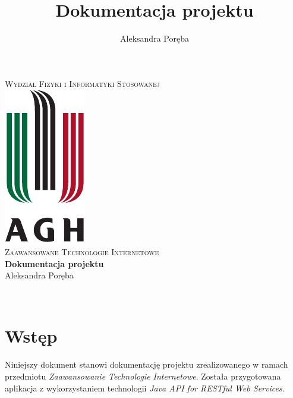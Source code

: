 \documentclass[12pt]{article}
\title{Dokumentacja projektu}
\author{Aleksandra Poręba}
\makeatletter
\let\thetitle\@title
\let\theauthor\@author
\makeatother
\begin{document}
\begin{center}
\textsc{\normalsize Wydział Fizyki i Informatyki Stosowanej}\\[2.0cm] 
\includegraphics[scale = 1]{logo.pdf}\\[1cm] 
\textsc{\Large Zaawansowane Technologie Internetowe}\\[0.4cm] 


{ \huge \bfseries \LARGE{Dokumentacja projektu} }\\[0.2cm] 

\flushright \Large Aleksandra Poręba

\vfill 

\center {\today}\\[2cm] 


\pagebreak 

\end{center}

\setcounter{tocdepth}{2}
\tableofcontents
\pagebreak


\pagestyle{fancy}
\fancyhf{}

\rhead{\theauthor}
\lhead{\thetitle}
\cfoot{\thepage}

\section{Wstęp}
Niniejszy dokument stanowi dokumentację projektu zrealizowanego w ramach przedmiotu \textit{Zaawansowanie Technologie Internetowe}. Została przygotowana aplikacja 
z wykorzystaniem technologii \textit{Java API for RESTful Web Services}.
\end{document}

